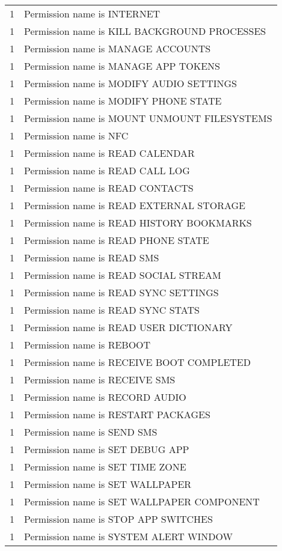 \begin{center}
\begin{longtable}{l|l}
    1 & Permission name is INTERNET \\
    1 & Permission name is KILL BACKGROUND PROCESSES \\
    1 & Permission name is MANAGE ACCOUNTS \\
    1 & Permission name is MANAGE APP TOKENS \\
    1 & Permission name is MODIFY AUDIO SETTINGS \\
    1 & Permission name is MODIFY PHONE STATE \\
    1 & Permission name is MOUNT UNMOUNT FILESYSTEMS \\
    1 & Permission name is NFC \\
    1 & Permission name is READ CALENDAR \\
    1 & Permission name is READ CALL LOG \\
    1 & Permission name is READ CONTACTS \\
    1 & Permission name is READ EXTERNAL STORAGE \\
    1 & Permission name is READ HISTORY BOOKMARKS \\
    1 & Permission name is READ PHONE STATE \\
    1 & Permission name is READ SMS \\
    1 & Permission name is READ SOCIAL STREAM \\
    1 & Permission name is READ SYNC SETTINGS \\
    1 & Permission name is READ SYNC STATS \\
    1 & Permission name is READ USER DICTIONARY \\
    1 & Permission name is REBOOT \\
    1 & Permission name is RECEIVE BOOT COMPLETED \\
    1 & Permission name is RECEIVE SMS \\
    1 & Permission name is RECORD AUDIO \\
    1 & Permission name is RESTART PACKAGES \\
    1 & Permission name is SEND SMS \\
    1 & Permission name is SET DEBUG APP \\
    1 & Permission name is SET TIME ZONE \\
    1 & Permission name is SET WALLPAPER \\
    1 & Permission name is SET WALLPAPER COMPONENT \\
    1 & Permission name is STOP APP SWITCHES \\
    1 & Permission name is SYSTEM ALERT WINDOW \\

\end{longtable}
\end{center}
